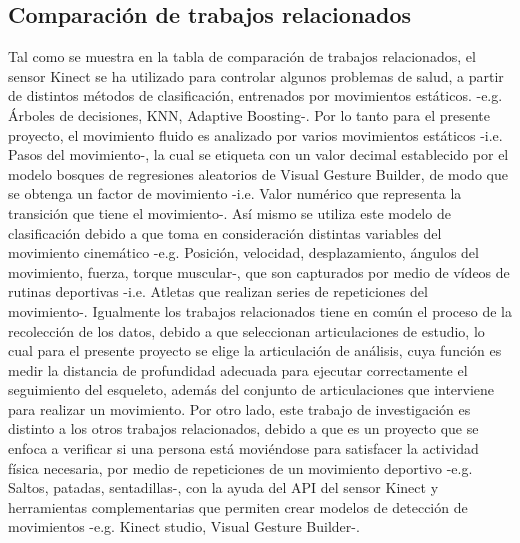 \subsection{Comparaci\'on de trabajos relacionados} \label{tr:10}
Tal como se muestra en la tabla de comparaci\'on de trabajos relacionados, el sensor Kinect se ha utilizado para controlar algunos problemas de salud, a partir de distintos m\'etodos de clasificaci\'on, entrenados por  movimientos est\'aticos. -e.g. \'Arboles de decisiones, KNN, Adaptive Boosting-. Por lo tanto para el presente proyecto, el movimiento fluido es analizado por varios movimientos est\'aticos -i.e. Pasos del movimiento-, la cual se etiqueta con un valor decimal establecido por el modelo bosques de regresiones aleatorios de Visual Gesture Builder, de modo que se obtenga un factor de movimiento -i.e. Valor num\'erico que representa la transici\'on que tiene el movimiento-. As\'i mismo se utiliza este modelo de clasificaci\'on debido a que toma en consideraci\'on distintas variables del movimiento cinem\'atico -e.g. Posici\'on, velocidad, desplazamiento, \'angulos del movimiento, fuerza, torque muscular-, que son capturados por medio de v\'ideos de rutinas deportivas -i.e. Atletas que realizan series de repeticiones del movimiento-.
\medbreak
Igualmente los trabajos relacionados tiene en com\'un el proceso de la recolecci\'on de los datos, debido a que seleccionan articulaciones de estudio, lo cual para el presente proyecto se elige la articulaci\'on de an\'alisis, cuya funci\'on es medir la distancia de profundidad adecuada para ejecutar correctamente el seguimiento del esqueleto, adem\'as del conjunto de articulaciones que interviene para realizar un movimiento.
\medbreak
Por otro lado, este trabajo de investigaci\'on es distinto a los otros trabajos relacionados, debido a que es un proyecto que se enfoca a verificar si una persona est\'a movi\'endose para satisfacer la actividad f\'isica necesaria, por medio de repeticiones de un movimiento deportivo -e.g. Saltos, patadas, sentadillas-, con la ayuda del API del sensor Kinect y herramientas complementarias que permiten crear modelos de detecci\'on de movimientos -e.g. Kinect studio, Visual Gesture Builder-.
